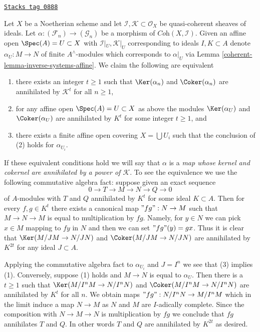 \begin{remark}
\label{coherent-remark-inverse-systems-kernel-cokernel-annihilated-by}
\href{https://stacks.math.columbia.edu/tag/0888}{\texttt{Stacks tag 0888}}

Let $X$ be a Noetherian scheme and let
$\mathcal{I}, \mathcal{K} \subset \mathcal{O}_X$
be quasi-coherent sheaves of ideals. Let
$\alpha : (\mathcal{F}_n) \to (\mathcal{G}_n)$ be a morphism of
$\textit{Coh}(X, \mathcal{I})$.
Given an affine open $\Spec(A) = U \subset X$ with
$\mathcal{I}|_U, \mathcal{K}|_U$ corresponding to ideals $I, K \subset A$
denote $\alpha_U : M \to N$ of finite $A^\wedge$-modules which
corresponds to $\alpha|_U$ via Lemma \ref{coherent-lemma-inverse-systems-affine}.
We claim the following are equivalent
\begin{enumerate}
\item there exists an integer $t \geq 1$ such that
$\Ker(\alpha_n)$ and $\Coker(\alpha_n)$
are annihilated by $\mathcal{K}^t$ for all $n \geq 1$,
\item for any affine open $\Spec(A) = U \subset X$ as above
the modules $\Ker(\alpha_U)$ and $\Coker(\alpha_U)$
are annihilated by $K^t$ for some integer $t \geq 1$, and
\item there exists a finite affine open covering $X = \bigcup U_i$
such that the conclusion of (2) holds for $\alpha_{U_i}$.
\end{enumerate}
If these equivalent conditions hold we will say that
$\alpha$ is a
{\it map whose kernel and cokernel are annihilated by a power of
$\mathcal{K}$}.
To see the equivalence we use the following commutative algebra fact:
suppose given an exact sequence
$$
0 \to T \to M \to N \to Q \to 0
$$
of $A$-modules with $T$ and $Q$ annihilated by $K^t$ for some
ideal $K \subset A$. Then for every $f, g \in K^t$ there exists a
canonical map $"fg": N \to M$ such that $M \to N \to M$ is equal to
multiplication by $fg$. Namely, for $y \in N$ we can pick $x \in M$
mapping to $fy$ in $N$ and then we can set $"fg"(y) = gx$. Thus it is
clear that $\Ker(M/JM \to N/JN)$ and $\Coker(M/JM \to N/JN)$
are annihilated by $K^{2t}$ for any ideal $J \subset A$.

\medskip\noindent
Applying the commutative algebra fact to $\alpha_{U_i}$ and $J = I^n$
we see that (3) implies (1). Conversely,
suppose (1) holds and $M \to N$ is equal to $\alpha_U$. Then there is
a $t \geq 1$ such that
$\Ker(M/I^nM \to N/I^nN)$ and $\Coker(M/I^nM \to N/I^nN)$
are annihilated by $K^t$ for all $n$. We obtain maps
$"fg" : N/I^nN \to M/I^nM$ which in the limit induce a map $N \to M$
as $N$ and $M$ are $I$-adically complete. Since the composition with
$N \to M \to N$ is multiplication by $fg$ we conclude that $fg$
annihilates $T$ and $Q$. In other words $T$ and $Q$ are annihilated by
$K^{2t}$ as desired.
\end{remark}

